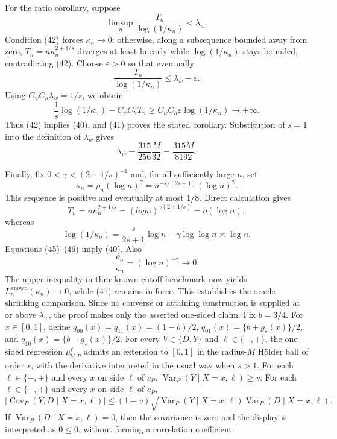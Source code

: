 For the ratio corollary, suppose
\[
 \limsup_n\frac{T_n}{\log(1/\kappa_n)}<\lambda_w.
 \tag{42}
\]
Condition (42) forces \(\kappa_n\to0\): otherwise, along a subsequence bounded away from zero, \(T_n=n\kappa_n^{2+1/s}\) diverges at least linearly while \(\log(1/\kappa_n)\) stays bounded, contradicting (42).  Choose \(\varepsilon>0\) so that eventually
\[
 \frac{T_n}{\log(1/\kappa_n)}\le\lambda_w-\varepsilon.
\]
Using \(C_\psi C_h\lambda_w=1/s\), we obtain
\[
 \frac1s\log(1/\kappa_n)-C_\psi C_hT_n
 \ge C_\psi C_h\varepsilon\log(1/\kappa_n)
 \longrightarrow+\infty.
 \tag{43}
\]
Thus (42) implies (40), and (41) proves the stated corollary.  Substitution of \(s=1\) into the definition of \(\lambda_w\) gives
\[
 \lambda_w=\frac{315}{256}\frac{M}{32}=\frac{315M}{8192}.
\]

Finally, fix \(0<\gamma<(2+1/s)^{-1}\) and, for all sufficiently large \(n\), set
\[
 \kappa_n=\rho_n(\log n)^\gamma
 =n^{-s/(2s+1)}(\log n)^\gamma.
 \tag{44}
\]
This sequence is positive and eventually at most \(1/8\).  Direct calculation gives
\[
 T_n=n\kappa_n^{2+1/s}
 =(log n)^{\gamma(2+1/s)}=o(\log n),
 \tag{45}
\]
whereas
\[
 \log(1/\kappa_n)
 =\frac{s}{2s+1}\log n-\gamma\log\log n
 \asymp\log n.
 \tag{46}
\]
Equations (45)--(46) imply (40).  Also
\[
 \frac{\rho_n}{\kappa_n}=(\log n)^{-\gamma}\longrightarrow0.
\]
The upper inequality in \(\mathrm{thm:known\mbox{-}cutoff\mbox{-}benchmark}\) now yields \(L_n^{\mathrm{known}}(\kappa_n)\to0\), while (41) remains in force.  This establishes the oracle-shrinking comparison.  Since no converse or attaining construction is supplied at or above \(\lambda_w\), the proof makes only the asserted one-sided claim.
Fix \(b=3/4\). For \(x\in[0,1]\), define \(q_{00}(x)=q_{11}(x)=(1-b)/2\), \(q_{01}(x)=\{b+g_\star(x)\}/2\), and \(q_{10}(x)=\{b-g_\star(x)\}/2\).
For every \(V\in\{D,Y\}\) and \(\ell\in\{-,+\}\), the one-sided regression \(\mu_{V,P}^{\ell}\) admits an extension to \([0,1]\) in the radius-\(M\) H\"older ball of order \(s\), with the derivative interpreted in the usual way when \(s>1\).
For each \(\ell\in\{-,+\}\) and every \(x\) on side \(\ell\) of \(c_P\), \(\operatorname{Var}_P(Y\mid X=x,\ell)\ge v\).
For each \(\ell\in\{-,+\}\) and every \(x\) on side \(\ell\) of \(c_P\),
\[
 |\operatorname{Cov}_P(Y,D\mid X=x,\ell)|
 \le(1-v)\sqrt{\operatorname{Var}_P(Y\mid X=x,\ell)
                    \operatorname{Var}_P(D\mid X=x,\ell)}.
\]
If \(\operatorname{Var}_P(D\mid X=x,\ell)=0\), then the covariance is zero and the display is interpreted as \(0\le0\), without forming a correlation coefficient.

